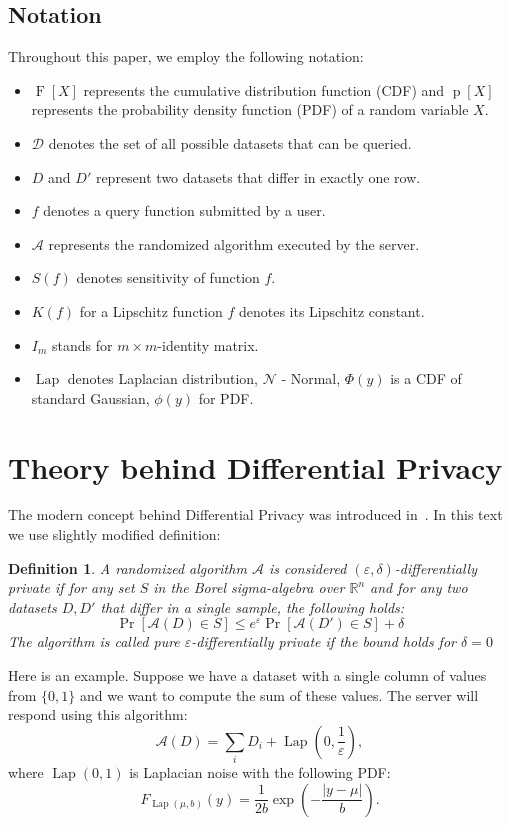 \documentclass[12pt,letterpaper]{article}
\newcommand{\R}{\mathbb{R}}
\let\eps\varepsilon
\newcommand{\F}{\operatorname{F}}
\newcommand{\p}{\operatorname{p}}
\newtheorem{definition}{Definition}
\newcommand{\Lap}{\operatorname{Lap}}
\newcommand{\No}{\mathcal{N}}
\begin{document}
\subsection{Notation}
Throughout this paper, we employ the following notation:
\begin{itemize}
  \item $\F[X]$ represents the cumulative distribution function (CDF) and $\p[X]$ represents the probability density function (PDF) of a random variable $X$.
  \item $\mathcal{D}$ denotes the set of all possible datasets that can be queried.
  \item $D$ and $D'$ represent two datasets that differ in exactly one row.
  \item $f$ denotes a query function submitted by a user.
  \item $\mathcal{A}$ represents the randomized algorithm executed by the server.
  \item $S(f)$ denotes sensitivity of function $f$.
  \item $K(f)$ for a Lipschitz function $f$ denotes its Lipschitz constant.
  \item $I_m$ stands for $m \times m$-identity matrix.
  \item $\Lap$ denotes Laplacian distribution, $\No$ - Normal, $\Phi(y)$ is a CDF of standard Gaussian, $\phi(y)$ for PDF.
\end{itemize}

\section{Theory behind Differential Privacy}

The modern concept behind Differential Privacy was introduced in~\cite{dwork}. In this text we use slightly modified definition:

\begin{definition}
A randomized algorithm $\mathcal{A}$ is considered $(\eps, \delta)$-differentially private if for any set $S$ in the Borel sigma-algebra over $\R^n$ and for any two datasets $D, D'$ that differ in a single sample, the following holds:
$$
\Pr[\mathcal{A}(D) \in S] \leq e^{\eps}\Pr[\mathcal{A}(D') \in S] + \delta
$$
The algorithm is called pure $\eps$-differentially private if the bound holds for $\delta=0$
\end{definition}

Here is an example. Suppose we have a dataset with a single column of values from $\{0, 1\}$ and we want to compute the sum of these values. The server will respond using this algorithm:
$$
\mathcal{A}(D) = \sum_i D_i + \operatorname{Lap}\left(0, \frac{1}{\eps}\right),
$$
where $\operatorname{Lap}(0, 1)$ is Laplacian noise with the following PDF:
$$
F_{\operatorname{Lap}(\mu, b)}(y) = \frac{1}{2b}\exp(-\frac{|y - \mu|}{b}).
$$
\end{document}
